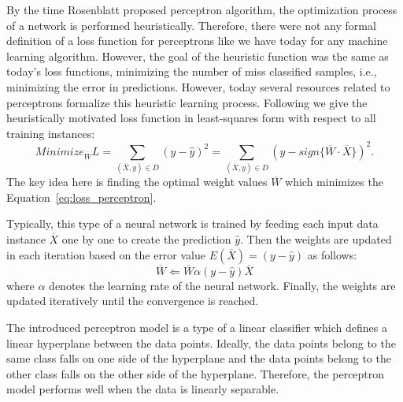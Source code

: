 By the time Rosenblatt proposed perceptron algorithm, the optimization process of a network is performed heuristically. Therefore, there were not any formal definition of a loss function for perceptrons like we have today for any machine learning algorithm. However, the goal of the heuristic function was the same as today's loss functions, minimizing the number of miss classified samples, i.e., minimizing the error in predictions. However, today several resources related to perceptrons formalize this heuristic learning process. Following we give the heuristically motivated loss function in least-squares form with respect to all training instances:
\begin{equation}
    Minimize_{\overline{W}} L=\sum\limits_{(\overline{X},y) \in D}(y-\hat{y})^2 = \sum\limits_{(\overline{X},y) \in D}(y-sign\{\overline{W}\cdot\overline{X}\})^2 .
    \label{eq:loss_perceptron}
\end{equation}
The key idea here is finding the optimal weight values $\overline{W}$ which minimizes the Equation~\ref{eq:loss_perceptron}. 


Typically, this type of a neural network is trained by feeding each input data instance $\overline{X}$ one by one to create the prediction $\hat{y}$. Then the weights are updated in each iteration based on the error value $E(\overline{X}) = (y-\hat{y})$ as follows:
\begin{equation}
    \overline{W} \Leftarrow \overline{W} \alpha (y-\hat{y})\overline{X}
\end{equation}
where $\alpha$ denotes the learning rate of the neural network. Finally, the weights are updated iteratively until the convergence is reached. 

The introduced perceptron model is a type of a linear classifier which defines a linear hyperplane between the data points. Ideally, the data points belong to the same class falls on one side of the hyperplane and the data points belong to the other class falls on the other side of the hyperplane. Therefore, the perceptron model performs well when the data is linearly separable.
